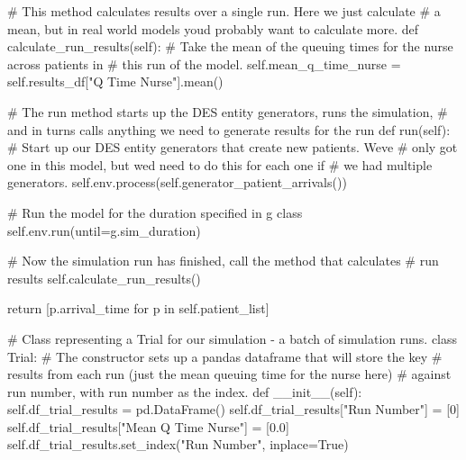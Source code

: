 \documentclass[
  letterpaper,
  DIV=11,
  numbers=noendperiod]{scrreprt}
\newenvironment{Shaded}{}{}
\newcommand{\CommentTok}[1]{\textcolor[rgb]{0.42,0.45,0.49}{#1}}
\newcommand{\ControlFlowTok}[1]{\textcolor[rgb]{0.84,0.23,0.29}{#1}}
\newcommand{\DecValTok}[1]{\textcolor[rgb]{0.00,0.36,0.77}{#1}}
\newcommand{\FloatTok}[1]{\textcolor[rgb]{0.00,0.36,0.77}{#1}}
\newcommand{\FunctionTok}[1]{\textcolor[rgb]{0.44,0.26,0.76}{#1}}
\newcommand{\KeywordTok}[1]{\textcolor[rgb]{0.84,0.23,0.29}{#1}}
\newcommand{\NormalTok}[1]{\textcolor[rgb]{0.14,0.16,0.18}{#1}}
\newcommand{\OperatorTok}[1]{\textcolor[rgb]{0.14,0.16,0.18}{#1}}
\newcommand{\StringTok}[1]{\textcolor[rgb]{0.01,0.18,0.38}{#1}}
\newcommand{\VariableTok}[1]{\textcolor[rgb]{0.89,0.38,0.04}{#1}}
\begin{document}
\begin{tcolorbox}
\begin{Shaded}
\begin{Highlighting}[]
    \CommentTok{\# This method calculates results over a single run.  Here we just calculate}
    \CommentTok{\# a mean, but in real world models you\textquotesingle{}d probably want to calculate more.}
    \KeywordTok{def}\NormalTok{ calculate\_run\_results(}\VariableTok{self}\NormalTok{):}
        \CommentTok{\# Take the mean of the queuing times for the nurse across patients in}
        \CommentTok{\# this run of the model.}
        \VariableTok{self}\NormalTok{.mean\_q\_time\_nurse }\OperatorTok{=} \VariableTok{self}\NormalTok{.results\_df[}\StringTok{"Q Time Nurse"}\NormalTok{].mean()}

    \CommentTok{\# The run method starts up the DES entity generators, runs the simulation,}
    \CommentTok{\# and in turns calls anything we need to generate results for the run}
    \KeywordTok{def}\NormalTok{ run(}\VariableTok{self}\NormalTok{):}
        \CommentTok{\# Start up our DES entity generators that create new patients.  We\textquotesingle{}ve}
        \CommentTok{\# only got one in this model, but we\textquotesingle{}d need to do this for each one if}
        \CommentTok{\# we had multiple generators.}
        \VariableTok{self}\NormalTok{.env.process(}\VariableTok{self}\NormalTok{.generator\_patient\_arrivals())}

        \CommentTok{\# Run the model for the duration specified in g class}
        \VariableTok{self}\NormalTok{.env.run(until}\OperatorTok{=}\NormalTok{g.sim\_duration)}

        \CommentTok{\# Now the simulation run has finished, call the method that calculates}
        \CommentTok{\# run results}
        \VariableTok{self}\NormalTok{.calculate\_run\_results()}

        \ControlFlowTok{return}\NormalTok{ [p.arrival\_time }\ControlFlowTok{for}\NormalTok{ p }\KeywordTok{in} \VariableTok{self}\NormalTok{.patient\_list]}

\CommentTok{\# Class representing a Trial for our simulation {-} a batch of simulation runs.}
\KeywordTok{class}\NormalTok{ Trial:}
    \CommentTok{\# The constructor sets up a pandas dataframe that will store the key}
    \CommentTok{\# results from each run (just the mean queuing time for the nurse here)}
    \CommentTok{\# against run number, with run number as the index.}
    \KeywordTok{def}  \FunctionTok{\_\_init\_\_}\NormalTok{(}\VariableTok{self}\NormalTok{):}
        \VariableTok{self}\NormalTok{.df\_trial\_results }\OperatorTok{=}\NormalTok{ pd.DataFrame()}
        \VariableTok{self}\NormalTok{.df\_trial\_results[}\StringTok{"Run Number"}\NormalTok{] }\OperatorTok{=}\NormalTok{ [}\DecValTok{0}\NormalTok{]}
        \VariableTok{self}\NormalTok{.df\_trial\_results[}\StringTok{"Mean Q Time Nurse"}\NormalTok{] }\OperatorTok{=}\NormalTok{ [}\FloatTok{0.0}\NormalTok{]}
        \VariableTok{self}\NormalTok{.df\_trial\_results.set\_index(}\StringTok{"Run Number"}\NormalTok{, inplace}\OperatorTok{=}\VariableTok{True}\NormalTok{)}


\end{Highlighting}
\end{Shaded}
\end{tcolorbox}
\end{document}
